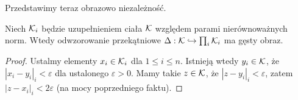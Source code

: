 Przedstawimy teraz obrazowo niezależność.

\begin{fakt}
	Niech $\mathcal K_i$ będzie uzupełnieniem ciała $\mathcal K$ względem parami nierównoważnych norm.
	Wtedy odwzorowanie przekątniowe $\Delta: \mathcal K \hookrightarrow \prod_i \mathcal K_i$ ma gęsty obraz.
\end{fakt}

\begin{proof}
	Ustalmy elementy $x_i \in \mathcal K_i$ dla $1 \le i \le n$.
	Istnieją wtedy $y_i \in \mathcal K$, że $|x_i-y_i|_i < \varepsilon$ dla ustalonego $\varepsilon > 0$.
	Mamy takie $z \in \mathcal K$, że $|z - y_i|_i < \varepsilon$, zatem $|z - x_i|_i < 2 \varepsilon$ (na mocy poprzedniego faktu).
\end{proof}
